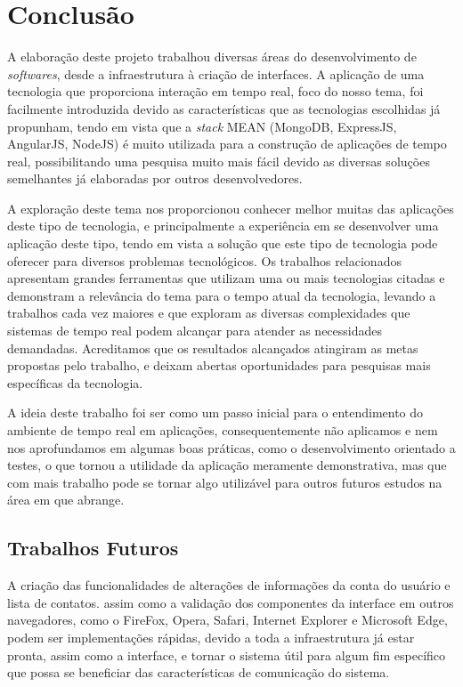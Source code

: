 \chapter{Conclusão}
A elaboração deste projeto trabalhou diversas áreas do desenvolvimento de \textit{softwares}, desde a infraestrutura à criação de interfaces. A aplicação de uma tecnologia que proporciona interação em tempo real, foco do nosso tema, foi facilmente introduzida devido as características que as tecnologias escolhidas já propunham, tendo em vista que a \textit{stack} MEAN (MongoDB, ExpressJS, AngularJS, NodeJS) é muito utilizada para a construção de aplicações de tempo real, possibilitando uma pesquisa muito mais fácil devido as diversas soluções semelhantes já elaboradas por outros desenvolvedores.

A exploração deste tema nos proporcionou conhecer melhor muitas das aplicações deste tipo de tecnologia, e principalmente a experiência em se desenvolver uma aplicação deste tipo, tendo em vista a solução que este tipo de tecnologia pode oferecer para diversos problemas tecnológicos. Os trabalhos relacionados apresentam grandes ferramentas que utilizam uma ou mais tecnologias citadas e demonstram a relevância do tema para o tempo atual da tecnologia, levando a trabalhos cada vez maiores e que exploram as diversas complexidades que sistemas de tempo real podem alcançar para atender as necessidades demandadas. Acreditamos que os resultados alcançados atingiram as metas propostas pelo trabalho, e deixam abertas oportunidades para pesquisas mais específicas da tecnologia.

A ideia deste trabalho foi ser como um passo inicial para o entendimento do ambiente de tempo real em aplicações, consequentemente não aplicamos e nem nos aprofundamos em algumas boas práticas, como o desenvolvimento orientado a testes, o que tornou a utilidade da aplicação meramente demonstrativa, mas que com mais trabalho pode se tornar algo utilizável para outros futuros estudos na área em que abrange.

\section{Trabalhos Futuros}
A criação das funcionalidades de alterações de informações da conta do usuário e lista de contatos. assim como a validação dos componentes da interface em outros navegadores, como o FireFox, Opera, Safari, Internet Explorer e Microsoft Edge, podem ser implementações rápidas, devido a toda a infraestrutura já estar pronta, assim como a interface, e tornar o sistema útil para algum fim específico que possa se beneficiar das características de comunicação do sistema.

